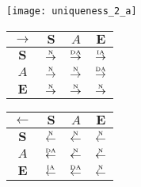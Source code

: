 \begin{figure}[htbp]
  \centering

  \begin{subfigure}{1\textwidth}
    \centering
    \begin{minipage}[b]{1\textwidth}
      \centering
      \texttt{[image: uniqueness\_2\_a]}
    \end{minipage}
    \begin{minipage}[b]{0.3\textwidth}
      \vspace{1em}
      \centering
      \begin{tabular}{|c|c|c|c|} \hline
        $\rightarrow$ & $\bm{S}$ & $A$ & $\bm{E}$\\ \hline
        $\bm{S}$ & $\overset{\text{\tiny{N}}}{\rightarrow}$ & $\overset{\text{\tiny{DA}}}{\rightarrow}$ & $\overset{\text{\tiny{IA}}}{\rightarrow}$\\ \hline
        $A$ & $\overset{\text{\tiny{N}}}{\rightarrow}$ & $\overset{\text{\tiny{N}}}{\rightarrow}$ & $\overset{\text{\tiny{DA}}}{\rightarrow}$\\ \hline
        $\bm{E}$ & $\overset{\text{\tiny{N}}}{\rightarrow}$ & $\overset{\text{\tiny{N}}}{\rightarrow}$ & $\overset{\text{\tiny{N}}}{\rightarrow}$\\ \hline
      \end{tabular}
    \end{minipage}
    \begin{minipage}[b]{0.3\textwidth}
      \vspace{1em}
      \centering
      \begin{tabular}{|c|c|c|c|} \hline
        $\leftarrow$ & $\bm{S}$ & $A$ & $\bm{E}$\\ \hline
        $\bm{S}$ & $\overset{\text{\tiny{N}}}{\leftarrow}$ & $\overset{\text{\tiny{N}}}{\leftarrow}$ & $\overset{\text{\tiny{N}}}{\leftarrow}$\\ \hline
        $A$ & $\overset{\text{\tiny{DA}}}{\leftarrow}$ & $\overset{\text{\tiny{N}}}{\leftarrow}$ & $\overset{\text{\tiny{N}}}{\leftarrow}$\\ \hline
        $\bm{E}$ & $\overset{\text{\tiny{IA}}}{\leftarrow}$ & $\overset{\text{\tiny{DA}}}{\leftarrow}$ & $\overset{\text{\tiny{N}}}{\leftarrow}$\\ \hline
      \end{tabular}
    \end{minipage}
    \begin{minipage}[b]{0.3\textwidth}
      \vspace{1em}

\end{minipage}
\end{subfigure}
\end{figure}
